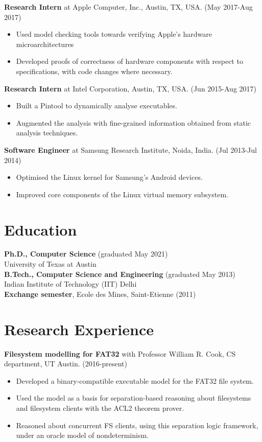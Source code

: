 \documentclass[margin]{res}
\begin{document}
\begin{resume}
 {\bf Research Intern} at Apple Computer, Inc., Austin, TX,
 USA. \hfill (May 2017-Aug 2017)
 \begin{itemize} \itemsep -2pt  %
 \item Used model checking tools towards verifying Apple's hardware microarchitectures
 \item Developed proofs of correctness of hardware components with
   respect to specifications, with code changes where necessary.
 \end{itemize}

 {\bf Research Intern} at Intel Corporation, Austin, TX, USA. \hfill
 (Jun 2015-Aug 2017)
 \begin{itemize} \itemsep -2pt  %
 \item Built a Pintool to dynamically analyse executables.
 \item Augmented
   the analysis with fine-grained information obtained from static
   analysis techniques.
 \end{itemize}

 {\bf Software Engineer} at Samsung Research Institute, Noida,
 India. \hfill (Jul 2013-Jul 2014)
 \begin{itemize} \itemsep -2pt  %
 \item Optimised the Linux kernel for Samsung's
   Android devices.
 \item Improved core components of the Linux virtual memory subsystem.
 \end{itemize}

\section{Education}
{\bf Ph.D., Computer Science} \hfill (graduated May 2021)\\
University of Texas at Austin\\
{\bf B.Tech., Computer Science and Engineering} \hfill (graduated May 2013)\\
Indian Institute of Technology (IIT) Delhi\\
{\bf Exchange semester}, Ecole des Mines, Saint-Etienne \hfill (2011)

\section{Research Experience}

 {\bf Filesystem modelling for FAT32} with Professor William R. Cook, CS department, UT Austin. \hfill (2016-present)
 \begin{itemize} \itemsep -2pt  %
 \item Developed a binary-compatible executable model for the FAT32 file system.
 \item Used the model as a basis for separation-based reasoning about
   filesystems and filesystem clients with the ACL2 theorem prover.
 \item Reasoned about concurrent FS clients, using this separation logic framework, under an oracle model of
   nondeterminism.
 \end{itemize}


\end{resume}
\end{document}
